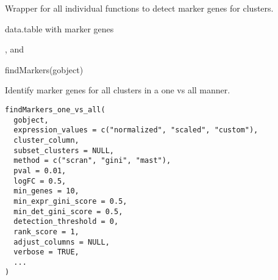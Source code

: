 \documentclass[a4paper]{book}
\begin{document}
%
\begin{Details}\relax
Wrapper for all individual functions to detect marker genes for clusters.
\end{Details}
%
\begin{Value}
data.table with marker genes
\end{Value}
%
\begin{SeeAlso}\relax
{},  and 
\end{SeeAlso}
%
\begin{Examples}
\begin{ExampleCode}
    findMarkers(gobject)
\end{ExampleCode}
\end{Examples}
%
\begin{Description}\relax
Identify marker genes for all clusters in a one vs all manner.
\end{Description}
%
\begin{Usage}
\begin{verbatim}
findMarkers_one_vs_all(
  gobject,
  expression_values = c("normalized", "scaled", "custom"),
  cluster_column,
  subset_clusters = NULL,
  method = c("scran", "gini", "mast"),
  pval = 0.01,
  logFC = 0.5,
  min_genes = 10,
  min_expr_gini_score = 0.5,
  min_det_gini_score = 0.5,
  detection_threshold = 0,
  rank_score = 1,
  adjust_columns = NULL,
  verbose = TRUE,
  ...
)
\end{verbatim}
\end{Usage}
%
\end{document}
